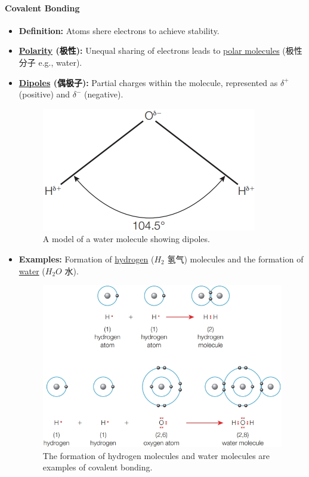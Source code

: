 \paragraph{Covalent Bonding}
\begin{itemize}
    \item \textbf{Definition:} Atoms shere electrons to achieve stability.
    \item \textbf{\underline{Polarity} (极性):} Unequal sharing of electrons leads to \underline{polar molecules} (极性分子 e.g.,
    water).
    \item \textbf{\underline{Dipoles} (偶极子):} Partial charges within the molecule, represented as $\delta^+$ (positive) and
    $\delta^-$ (negative).
    \begin{figure}[H]
        \centering
        \includegraphics[scale=0.5]{Biology/1A/Images/1A-1-3.png}
        \caption{A model of a water molecule showing dipoles.}
    \end{figure}
    \item \textbf{Examples:} Formation of \underline{hydrogen} ($H_2$ 氢气) molecules and the formation of \underline{water}
    ($H_2O$ 水).
    \begin{figure}[H]
        \centering
        \includegraphics[scale=0.5]{Biology/1A/Images/1A-1-2.png}
        \caption{The formation of hydrogen molecules and water molecules are examples of covalent bonding.}
    \end{figure}
\end{itemize}

